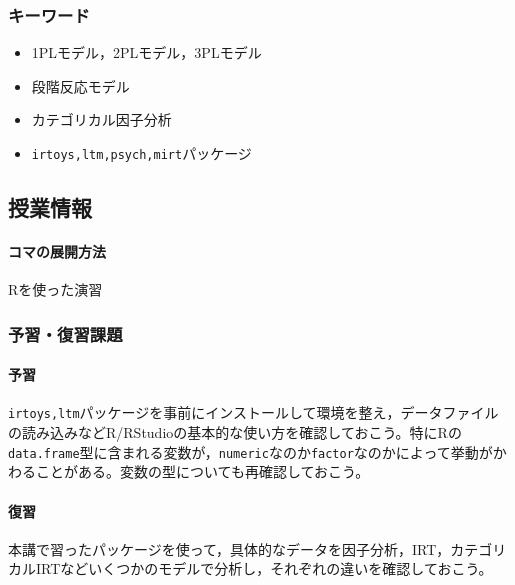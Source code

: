 \subsubsection{キーワード}
\begin{itemize}
    \item 1PLモデル，2PLモデル，3PLモデル
    \item 段階反応モデル
    \item カテゴリカル因子分析
    \item \texttt{irtoys,ltm,psych,mirt}パッケージ
\end{itemize}
\subsection{授業情報}
\paragraph{コマの展開方法}
Rを使った演習
\subsubsection{予習・復習課題}
\paragraph{予習} \texttt{irtoys,ltm}パッケージを事前にインストールして環境を整え，データファイルの読み込みなどR/RStudioの基本的な使い方を確認しておこう。特にRの\texttt{data.frame}型に含まれる変数が，\texttt{numeric}なのか\texttt{factor}なのかによって挙動がかわることがある。変数の型についても再確認しておこう。
\paragraph{復習}本講で習ったパッケージを使って，具体的なデータを因子分析，IRT，カテゴリカルIRTなどいくつかのモデルで分析し，それぞれの違いを確認しておこう。